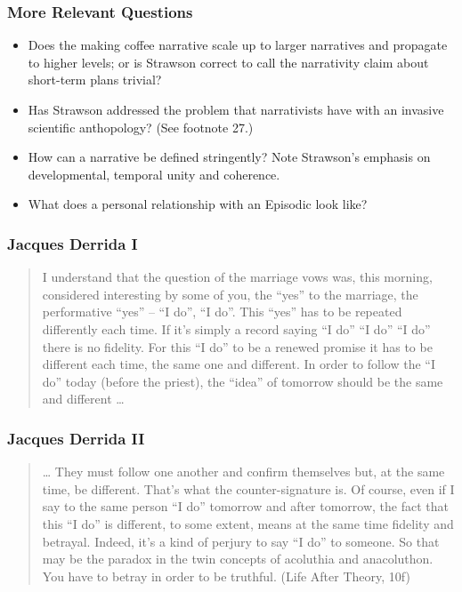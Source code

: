 \documentclass[xcolor=dvipsnames]{beamer}
\begin{document}
\begin{frame}
  \frametitle{More Relevant Questions}
  \begin{itemize}
  \item Does the making coffee narrative scale up to larger narratives
    and propagate to higher levels; or is Strawson correct to call the
    narrativity claim about short-term plans trivial?
  \item Has Strawson addressed the problem that narrativists have with
    an invasive scientific anthopology? (See footnote 27.)
  \item How can a narrative be defined stringently? Note Strawson's
    emphasis on developmental, temporal unity and coherence.
  \item What does a personal relationship with an Episodic look like?
  \end{itemize}
\end{frame}

\begin{frame}
  \frametitle{Jacques Derrida I}
  \begin{quote}
    I understand that the question of the marriage vows was, this
    morning, considered interesting by some of you, the ``yes'' to the
    marriage, the performative ``yes'' -- ``I do'', ``I do''. This
    ``yes'' has to be repeated differently each time. If it's simply a
    record saying ``I do'' ``I do'' ``I do'' there is no fidelity. For
    this ``I do'' to be a renewed promise it has to be different each
    time, the same one and different. In order to follow the ``I do''
    today (before the priest), the ``idea'' of tomorrow should be the
    same and different {\ldots}
  \end{quote}
\end{frame}

\begin{frame}
  \frametitle{Jacques Derrida II}
  \begin{quote}
    {\ldots} They must follow one another and confirm themselves but,
    at the same time, be different. That's what the counter-signature
    is. Of course, even if I say to the same person ``I do'' tomorrow
    and after tomorrow, the fact that this ``I do'' is different, to
    some extent, means at the same time fidelity and betrayal. Indeed,
    it's a kind of perjury to say ``I do'' to someone. So that may be
    the paradox in the twin concepts of acoluthia and anacoluthon. You
    have to betray in order to be truthful. (Life After Theory, 10f)
  \end{quote}
\end{frame}
\end{document}
